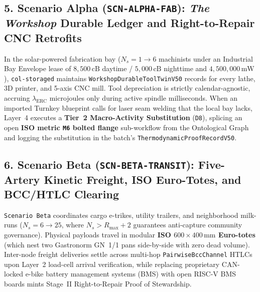 \subsection{5. Scenario Alpha (\texttt{SCN-ALPHA-FAB}): \textit{The Workshop} Durable Ledger and Right-to-Repair CNC Retrofits}
In the solar-powered fabrication bay ($N_s = 1 \to 6$ machinists under an Industrial Bay Envelope lease of $8{,}500\,\mathrm{cB}$ daytime / $5{,}000\,\mathrm{cB}$ nighttime and $4{,}500{,}000\,\mathrm{mW}$), \texttt{col-storaged} maintains \texttt{WorkshopDurableToolTwinV50} records for every lathe, 3D printer, and 5-axis CNC mill. Tool depreciation is strictly calendar-agnostic, accruing $\lambda_{\mathrm{ERC}}$ microjoules only during active spindle milliseconds. When an imported Turnkey blueprint calls for laser seam welding that the local bay lacks, Layer~4 executes a \textbf{Tier~2 Macro-Activity Substitution} (\texttt{D8}), splicing an open \textbf{ISO metric \texttt{M6} bolted flange} sub-workflow from the Ontological Graph and logging the substitution in the batch's \texttt{ThermodynamicProofRecordV50}.

\subsection{6. Scenario Beta (\texttt{SCN-BETA-TRANSIT}): Five-Artery Kinetic Freight, ISO Euro-Totes, and BCC/HTLC Clearing}
\texttt{Scenario Beta} coordinates cargo e-trikes, utility trailers, and neighborhood milk-runs ($N_s = 6 \to 25$, where $N_s > R_{\max} + 2$ guarantees anti-capture community governance). Physical payloads travel in modular \textbf{ISO $600 \times 400\,\mathrm{mm}$ Euro-totes} (which nest two Gastronorm GN~1/1 pans side-by-side with zero dead volume). Inter-node freight deliveries settle across multi-hop \texttt{PairwiseBccChannel} HTLCs upon Layer~2 load-cell arrival verification, while replacing proprietary CAN-locked e-bike battery management systems (BMS) with open RISC-V BMS boards mints Stage~II Right-to-Repair Proof of Stewardship.


